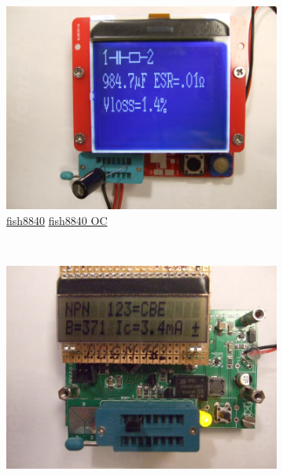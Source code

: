 \documentclass[pdftex,12pt,a4paper,english]{article}
\begin{document}
\begin{figure}[H]
  \begin{subfigure}[b]{.3\textwidth}
    \centering
    \includegraphics[width=1.\textwidth]{../PNG/m328_fish8840.JPG}
	  \\ \vspace{-0.5em}
	  {\href{run:./trunk/mega328_fish8840}{fish8840}} \hspace{10pt}
	  {\href{run:./trunk/mega328_fish8840_OC}{fish8840 OC}}
  \end{subfigure}
~
  \begin{subfigure}[b]{.3\textwidth}	%
    \centering
    \includegraphics[width=1.\textwidth]{../PNG/m328_dogm.JPG}
	  \\ \vspace{-0.5em}

\end{subfigure}
\end{figure}
\end{document}
